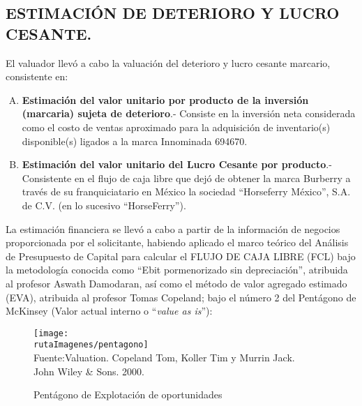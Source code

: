 \subsection{ESTIMACIÓN DE DETERIORO Y LUCRO CESANTE.}


El valuador llevó a cabo la valuación del deterioro y lucro cesante marcario, consistente en:
\begin{enumerate}[A.]

\item \textbf{\textcolor{principal}{Estimación del valor unitario por producto de la inversión (marcaria) sujeta de deterioro}}.- Consiste en la inversión neta considerada como el costo de ventas aproximado para la adquisición de inventario(s) disponible(s) ligados a la marca Innominada 694670.
\item \textbf{\textcolor{principal}{Estimación del valor unitario del Lucro Cesante por producto}}.- Consistente en el flujo de caja libre que dejó de obtener la marca Burberry a través de su franquiciatario en México la sociedad “Horseferry México”, S.A. de C.V. (en lo sucesivo “HorseFerry”).

\end{enumerate}

La estimación financiera se llevó a cabo a partir de la información de negocios proporcionada por el solicitante, habiendo aplicado el marco teórico del Análisis de Presupuesto de Capital para calcular el FLUJO DE CAJA LIBRE (FCL) bajo la metodología conocida como ``Ebit pormenorizado sin depreciación'', atribuida al profesor Aswath Damodaran, así como el método de valor agregado estimado (EVA), atribuida al profesor Tomas Copeland; bajo el número 2 del Pentágono de McKinsey (Valor actual interno o ``\textit{value as is}''):

\begin{figure}[H]
\centering
\caption{Pent\'agono de Explotaci\'on de oportunidades\label{fig:hexagono}}
\texttt{[image: \\rutaImagenes/pentagono]}\\
Fuente:Valuation. Copeland Tom, Koller Tim y Murrin Jack.\\

John Wiley \& Sons. 2000.
\end{figure}
